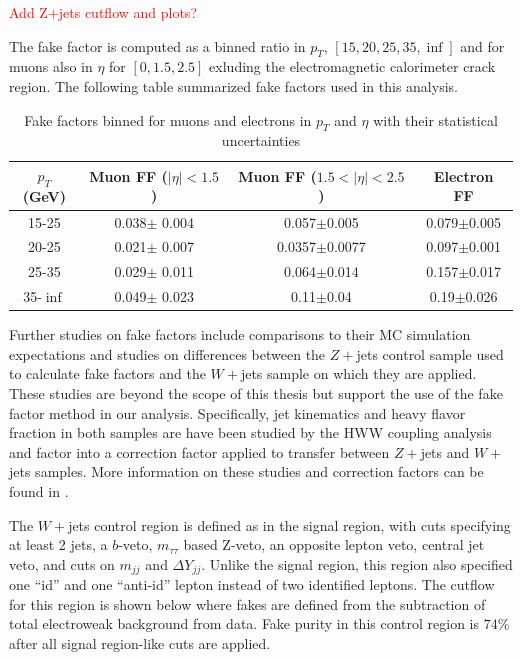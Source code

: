 \textcolor{red}{Add Z+jets cutflow and plots?}

The fake factor is computed as a binned ratio in $p_T$, $[15,20,25,35,\inf]$ and for muons also in $\eta$ for $[0,1.5,2.5]$ exluding the electromagnetic calorimeter crack region. The following table summarized fake factors used in this analysis.

\begin{table}[tb]
\centering
\caption{Fake factors binned for muons and electrons in $p_T$ and $\eta$ with their statistical uncertainties}
\label{tab:FakeFactors}
\begin{tabular}{c|c|c|c}
$p_T$(GeV) & Muon FF ($|\eta|<1.5$) & Muon FF ($1.5<|\eta|<2.5$) & Electron FF \\
\hline
15-25 & 0.038$\pm$ 0.004 & 0.057$\pm$0.005 & 0.079$\pm$0.005 \\
20-25 & 0.021$\pm$ 0.007 & 0.0357$\pm$0.0077 & 0.097$\pm$0.001 \\
25-35 & 0.029$\pm$ 0.011 & 0.064$\pm$0.014 & 0.157$\pm$0.017 \\
35-$\inf$ & 0.049$\pm$ 0.023 & 0.11$\pm$0.04 & 0.19$\pm$0.026 \\
\end{tabular}
\end{table}

Further studies on fake factors include comparisons to their MC simulation expectations and studies on differences between the $Z+$jets control sample used to calculate fake factors and the $W+$jets sample on which they are applied. These studies are beyond the scope of this thesis but support the use of the fake factor method in our analysis. Specifically, jet kinematics and heavy flavor fraction in both samples are have been studied by the HWW coupling analysis and factor into a correction factor applied to transfer between $Z+$jets and $W+$jets samples. More information on these studies and correction factors can be found in \cite{HWWCoupling}. 

The $W+$jets control region is defined as in the signal region, with cuts specifying at least 2 jets, a $b$-veto, $m_{\tau\tau}$ based Z-veto, an opposite lepton veto, central jet veto, and cuts on $m_{jj}$ and $\Delta Y_{jj}$. Unlike the signal region, this region also specified one ``id'' and one ``anti-id'' lepton instead of two identified leptons. The cutflow for this region is shown below where fakes are defined from the subtraction of total electroweak background from data. Fake purity in this control region is $74\%$ after all signal region-like cuts are applied.

